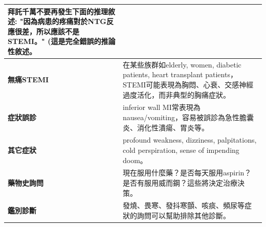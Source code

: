 \documentclass[fleqn,10pt,
paperheight=16cm, paperwidth=12cm,
includehead,%
nomarginpar,%
textwidth=10cm,%
headheight=25pt,%
]{wlscirep}
\begin{document}
\begin{longtable}{p{4cm} p{9cm}}
拜託千萬不要再發生下面的推理敘述: "因為病患的疼痛對於NTG反應很差，所以應該不是STEMI。" (這是完全錯誤的推論性敘述。\\ \hline

\textbf{無痛STEMI} & 
在某些族群如elderly, women, diabetic patients, heart transplant patients，STEMI可能表現為胸悶、心衰、交感神經過度活化，而非典型的胸痛症狀。\\ \hline

\textbf{症狀誤診} & 
inferior wall MI常表現為nausea/vomiting，容易被誤診為急性膽囊炎、消化性潰瘍、胃炎等。\\ \hline

\textbf{其它症狀} & 
profound weakness, dizziness, palpitations, cold perspiration, sense of impending doom。\\ \hline

\textbf{藥物史詢問} & 
現在服用什麼藥？是否每天服用aspirin？是否有服用威而鋼？這些將決定治療決策。\\ \hline

\textbf{鑑別診斷} & 
發燒、畏寒、發抖寒顫、咳痰、頻尿等症狀的詢問可以幫助排除其他診斷。\\ \hline

\end{longtable}
\end{document}

